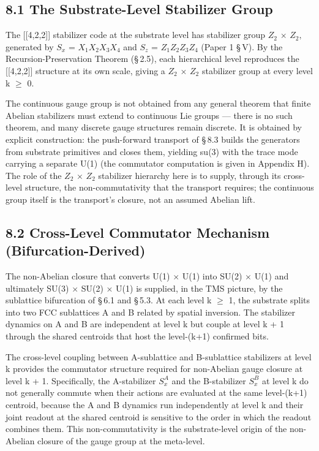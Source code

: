 \documentclass[11pt,oneside]{report}
\theoremstyle{definition}
\theoremstyle{remark}
\begin{document}
\subsection*{8.1 The Substrate-Level Stabilizer Group}

The [[4,2,2]] stabilizer code at the substrate level has
stabilizer group \ensuremath{Z_{2}} \ensuremath{\times} \ensuremath{Z_{2},} generated by \ensuremath{S_{x}} = \ensuremath{X_{1}X_{2}X_{3}X_{4}} and \ensuremath{S_{z}} = \ensuremath{Z_{1}Z_{2}Z_{3}Z_{4}}
(Paper 1 \S\,V). By the Recursion-Preservation Theorem (\S\,2.5), each
hierarchical level reproduces the [[4,2,2]] structure at its own
scale, giving a \ensuremath{Z_{2}} \ensuremath{\times} \ensuremath{Z_{2}} stabilizer group at every level k \ensuremath{\geq} 0.

The continuous gauge group is not obtained from any general theorem that
finite Abelian stabilizers must extend to continuous Lie groups --- there is no
such theorem, and many discrete gauge structures remain discrete. It is obtained
by explicit construction: the push-forward transport of \S\,8.3 builds the
generators from substrate primitives and closes them, yielding su(3) with the
trace mode carrying a separate U(1) (the commutator computation is given in
Appendix H). The role of the \ensuremath{Z_{2}} \ensuremath{\times} \ensuremath{Z_{2}} stabilizer hierarchy here is to
supply, through its cross-level structure, the non-commutativity that the
transport requires; the continuous group itself is the transport's closure, not
an assumed Abelian lift.

\subsection*{8.2 Cross-Level Commutator Mechanism (Bifurcation-Derived)}

The non-Abelian closure that converts U(1) \ensuremath{\times} U(1) into SU(2) \ensuremath{\times} U(1) and
ultimately SU(3) \ensuremath{\times} SU(2) \ensuremath{\times} U(1) is supplied, in the TMS picture, by the
sublattice bifurcation of \S\,6.1 and \S\,5.3. At each level k \ensuremath{\geq} 1, the
substrate splits into two FCC sublattices A and B related by spatial
inversion. The stabilizer dynamics on A and B are independent at level k
but couple at level k + 1 through the shared centroids that host the
level-(k+1) confirmed bits.

The cross-level coupling between A-sublattice and B-sublattice
stabilizers at level k provides the commutator structure required for
non-Abelian gauge closure at level k + 1. Specifically, the A-stabilizer
\ensuremath{S_{x}^{A}} and the B-stabilizer \ensuremath{S_{x}^{B}} at level k do not generally commute
when their actions are evaluated at the same level-(k+1) centroid,
because the A and B dynamics run independently at level k and their
joint readout at the shared centroid is sensitive to the order in which
the readout combines them. This non-commutativity is the substrate-level
origin of the non-Abelian closure of the gauge group at the meta-level.
\end{document}
